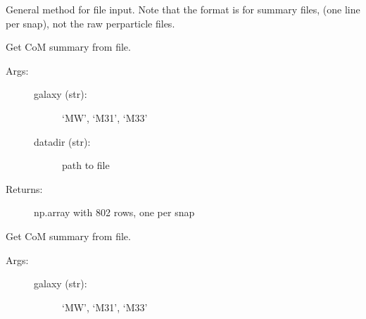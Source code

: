 \documentclass[letterpaper,10pt,english]{sphinxmanual}
\begin{document}
\begin{fulllineitems}
\begin{fulllineitems}
\label{\detokenize{timecourse:galaxy.timecourse.TimeCourse.read_file}}
General method for file input. Note that the format is for summary files,
(one line per snap), not the raw per\sphinxhyphen{}particle files.

\end{fulllineitems}


\begin{fulllineitems}
\label{\detokenize{timecourse:galaxy.timecourse.TimeCourse.read_com_file}}
Get CoM summary from file.
\begin{description}
\item[{Args:}] \leavevmode\begin{description}
\item[{galaxy (str): }] \leavevmode
‘MW’, ‘M31’, ‘M33’

\item[{datadir (str):}] \leavevmode
path to file

\end{description}

\item[{Returns:}] \leavevmode
np.array with 802 rows, one per snap

\end{description}

\end{fulllineitems}


\begin{fulllineitems}
\label{\detokenize{timecourse:galaxy.timecourse.TimeCourse.read_angmom_file}}
Get CoM summary from file.
\begin{description}
\item[{Args:}] \leavevmode\begin{description}
\item[{galaxy (str): }] \leavevmode
‘MW’, ‘M31’, ‘M33’


\end{description}
\end{description}
\end{fulllineitems}
\end{fulllineitems}
\end{document}
